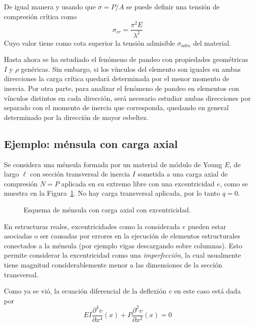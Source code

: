De igual manera y usando que $\sigma=P/A$ se puede definir una tensión de compresión crítica como  
\begin{equation}
\boxed{\sigma_{cr} = \frac{\pi^2 E}{\lambda^2}}
\end{equation}
Cuyo valor tiene como cota superior la tensión admisible $\sigma_{adm}$ del material.

Hasta ahora se ha estudiado el fenómeno de pandeo con propiedades geométricas $I$ y $\rho$ genéricas. Sin embargo, si los vínculos del elemento son iguales en ambas direcciones la carga crítica quedará determinada por el menor momento de inercia. Por otra parte, para analizar el fenómeno de pandeo en elementos con vínculos distintos en cada dirección, será necesario estudiar ambas direcciones por separado con el momento de inercia que corresponda, quedando en general determinado por la dirección de mayor esbeltez.

\subsection{Ejemplo: ménsula con carga axial}

Se considera una ménsula formada por un material de módulo de Young $E$, de largo $\ell$ con sección transversal de inercia $I$ sometida a una carga axial de compresión $N=P$ aplicada en su extremo libre con una excentricidad $e$, como se muestra en la Figura~\ref{fig:esqpand}. %
%
No hay carga transversal aplicada, por lo tanto $q=0$. %

\begin{figure}[htb]
\centering
\def\svgwidth{0.7\textwidth}

\caption{Esquema de ménsula con carga axial con excentricidad.}
\label{fig:esqpand}
\end{figure}

En estructuras reales, excentricidades como la considerada $e$ pueden estar asociadas o ser causadas por errores en la ejecución de elementos estructurales conectados a la ménsula (por ejemplo vigas descargando sobre columnas). %
%
Esto permite considerar la excentricidad como una \textit{imperfección}, la cual usualmente tiene magnitud considerablemente menor a las dimensiones de la sección transversal. %

Como ya se vió, la ecuación diferencial de la deflexión $v$ en este caso está dada por
%
$$
  E I \frac{\partial^4 v}{\partial x^4}(x)
+   P \frac{\partial^2 v}{\partial x^2}(x)
=   0
$$

